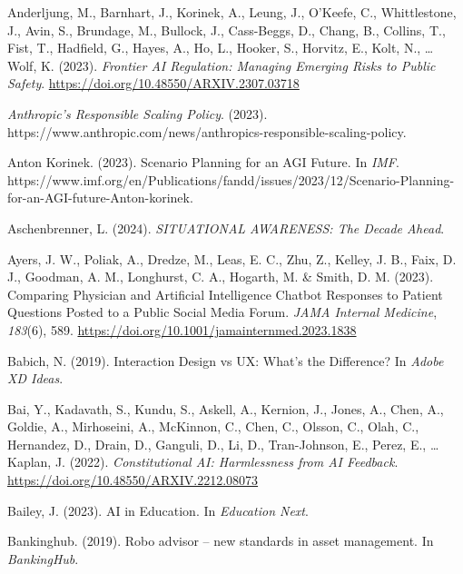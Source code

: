 \documentclass[
  letterpaper,
  DIV=11,
  numbers=noendperiod]{scrartcl}
\newlength{\cslhangindent}
\newenvironment{CSLReferences}[2] %
 {\begin{list}{}{%
  \setlength{\itemindent}{0pt}
  \setlength{\leftmargin}{0pt}
  \setlength{\parsep}{0pt}
  \ifodd #1
   \setlength{\leftmargin}{\cslhangindent}
   \setlength{\itemindent}{-1\cslhangindent}
  \fi
  \setlength{\itemsep}{#2\baselineskip}}}
 {\end{list}}
\begin{document}
\begin{CSLReferences}{1}{0}
Anderljung, M., Barnhart, J., Korinek, A., Leung, J., O'Keefe, C.,
Whittlestone, J., Avin, S., Brundage, M., Bullock, J., Cass-Beggs, D.,
Chang, B., Collins, T., Fist, T., Hadfield, G., Hayes, A., Ho, L.,
Hooker, S., Horvitz, E., Kolt, N., \ldots{} Wolf, K. (2023).
\emph{Frontier {AI Regulation}: {Managing Emerging Risks} to {Public
Safety}}. \url{https://doi.org/10.48550/ARXIV.2307.03718}

\emph{Anthropic's {Responsible Scaling Policy}}. (2023).
https://www.anthropic.com/news/anthropics-responsible-scaling-policy.

Anton Korinek. (2023). Scenario {Planning} for an {AGI Future}. In
\emph{IMF}.
https://www.imf.org/en/Publications/fandd/issues/2023/12/Scenario-Planning-for-an-AGI-future-Anton-korinek.

Aschenbrenner, L. (2024). \emph{{SITUATIONAL AWARENESS}: {The Decade
Ahead}}.

Ayers, J. W., Poliak, A., Dredze, M., Leas, E. C., Zhu, Z., Kelley, J.
B., Faix, D. J., Goodman, A. M., Longhurst, C. A., Hogarth, M. \& Smith,
D. M. (2023). Comparing {Physician} and {Artificial Intelligence Chatbot
Responses} to {Patient Questions Posted} to a {Public Social Media
Forum}. \emph{JAMA Internal Medicine}, \emph{183}(6), 589.
\url{https://doi.org/10.1001/jamainternmed.2023.1838}

Babich, N. (2019). Interaction {Design} vs {UX}: {What}'s the
{Difference}? In \emph{Adobe XD Ideas}.

Bai, Y., Kadavath, S., Kundu, S., Askell, A., Kernion, J., Jones, A.,
Chen, A., Goldie, A., Mirhoseini, A., McKinnon, C., Chen, C., Olsson,
C., Olah, C., Hernandez, D., Drain, D., Ganguli, D., Li, D.,
Tran-Johnson, E., Perez, E., \ldots{} Kaplan, J. (2022).
\emph{Constitutional {AI}: {Harmlessness} from {AI Feedback}}.
\url{https://doi.org/10.48550/ARXIV.2212.08073}

Bailey, J. (2023). {AI} in {Education}. In \emph{Education Next}.

Bankinghub. (2019). Robo advisor -- new standards in asset management.
In \emph{BankingHub}.


\end{CSLReferences}
\end{document}

